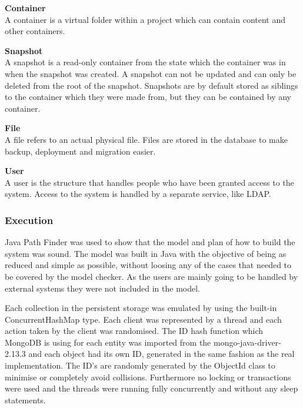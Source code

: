 \documentclass[a4paper,12pt]{article}
\begin{document}
\par \textbf{Container} \\
A container is a virtual folder within a project which can contain content and other containers.\\

\par \textbf{Snapshot} \\
A snapshot is a read-only container from the state which the container was in when the snapshot
was created.  A snapshot can not be updated and can only be deleted from the root of the snapshot.
Snapshots are by default stored as siblings to the container which they were made from, but they can
be contained by any container.\\

\par \textbf{File} \\
A file refers to an actual physical file. Files are stored in the database to make backup,
deployment and migration easier.\\

\par \textbf{User} \\
A user is the structure that handles people who have been granted access to the system. Access to
the system is handled by a separate service, like LDAP.\\

\subsubsection{Execution}
Java Path Finder was used to show that the model and plan of how to build the system was sound. The
model was built in Java with the objective of being as reduced and simple as possible, without
loosing any of the cases that needed to be covered by the model checker. As the users are mainly
going to be handled by external systems they were not included in the model.

Each collection in the persistent storage was emulated by using the built-in ConcurrentHashMap type.
Each client was represented by a thread and each action taken by the client was randomised. The ID
hash function which MongoDB is using for each entity was imported from the mongo-java-driver-2.13.3
and each object had its own ID, generated in the same fashion as the real implementation. The ID's
are randomly generated by the ObjectId class to minimise or completely avoid collisions.
Furthermore no locking or transactions were used and the threads were running fully concurrently and
without any sleep statements. 
\end{document}
